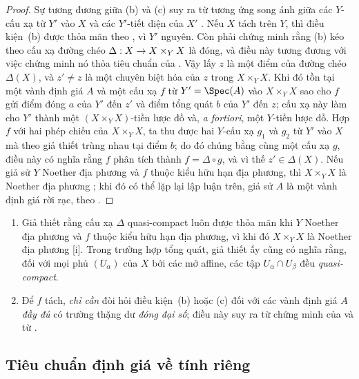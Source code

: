 \documentclass[oneside,10pt]{amsart}
\makeatletter
\newcommand{\ega@arrow}[2]{\mathchoice{#1}{#2}{#2}{#2}}
\renewcommand{\to}{\ega@arrow{\longrightarrow}{\rightarrow}}
\newcommand{\oldpage}[2][]{\marginnote{\normalfont\footnotesize\textbf{#1}~|~#2}\ignorespaces}
\let\EGAOriginalLabel\label
\renewcommand{\label}[1]{\phantomsection\EGAOriginalLabel{#1}}
\makeatother
\begin{document}
\begin{proof}
Sự tương đương giữa (b) và (c) suy ra từ tương ứng song ánh giữa các $Y$-cấu xạ từ $Y'$ vào $X$ và các $Y'$-tiết diện của $X'$ .
Nếu $X$ tách trên $Y$, thì điều kiện~(b) được thỏa mãn theo , vì $Y'$ nguyên.
Còn phải chứng minh rằng (b) kéo theo cấu xạ đường chéo $\Delta:X\to X\times_Y X$ là đóng, và điều này tương đương với việc chứng minh nó thỏa tiêu chuẩn của .
Vậy lấy $z$ là một điểm của đường chéo $\Delta(X)$, và $z'\neq z$ là một chuyên biệt hóa của $z$ trong $X\times_Y X$.
Khi đó tồn tại  một vành định giá $A$ và một cấu xạ $f$ từ $Y'=\Spec(A)$ vào $X\times_Y X$ sao cho $f$ gửi điểm đóng $a$ của $Y'$ đến $z'$ và điểm tổng quát $b$ của $Y'$ đến $z$;
cấu xạ này làm cho $Y'$ thành một $(X\times_Y X)$-tiền lược đồ và, \emph{a fortiori}, một $Y$-tiền lược đồ.
Hợp $f$ với hai phép chiếu của $X\times_Y X$, ta thu được hai $Y$-cấu xạ $g_1$ và $g_2$ từ $Y'$ vào $X$ mà theo giả thiết trùng nhau tại điểm $b$;
do đó chúng bằng cùng một cấu xạ $g$, điều này có nghĩa  rằng $f$ phân tích thành $f=\Delta\circ g$, và vì thế $z'\in\Delta(X)$.
Nếu giả sử $Y$ Noether địa phương và $f$ thuộc kiểu hữu hạn địa phương, thì $X\times_Y X$ là Noether địa phương ;
khi đó có thể lặp lại lập luận trên, giả sử $A$ là một vành định giá rời rạc, theo .
\end{proof}

\begin{remark}[7.2.4]
\label{II.7.2.4}
\begin{enumerate}
    \item[\rm{(i)}] Giả thiết rằng cấu xạ $\Delta$ quasi-compact luôn được thỏa mãn khi $Y$ Noether địa phương và $f$ thuộc kiểu hữu hạn địa phương, vì khi đó $X\times_Y X$ là Noether địa phương [i].
        Trong trường hợp tổng quát, giả thiết ấy cũng có nghĩa rằng, đối với mọi phủ $(U_\alpha)$ của $X$ bởi các mở affine, các tập $U_\alpha\cap U_\beta$ đều \emph{quasi-compact}.
    \item[\rm{(ii)}] Để $f$ tách, \emph{chỉ cần} đòi hỏi điều kiện~(b) hoặc (c) đối với các vành định giá $A$ \emph{đầy đủ} có trường thặng dư \emph{đóng đại số};
        điều này suy ra từ chứng minh của  và từ .
\end{enumerate}
\end{remark}
\oldpage[II]{143}

\subsection{Tiêu chuẩn định giá về tính riêng}
\label{subsection:II.7.3}
\end{document}
